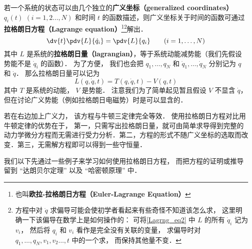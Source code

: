 

若一个系统的状态可以由几个独立的\textbf{广义坐标（generalized coordinates）} $q_i(t)$ $(i=1,2\dots,N)$ 和时间 $t$ 的函数描述，则广义坐标关于时间的函数可通过\textbf{拉格朗日方程（Lagrange equation）}\footnote{也叫\textbf{欧拉-拉格朗日方程（Euler-Lagrange Equation）}}\footnote{方程中对 $\dot q$ 求偏导可能会使初学者看起来有些奇怪不知道该怎么求， 这里明确一下该偏导在数学上是如何操作的： 可将\autoref{Lagrng_eq2} 中 $L$ 的所有 $\dot q_i$ 记为 $v_i$， 然后将 $q_i$ 和 $v_i$ 看作是完全没有关联的变量， 求偏导时对 $q_1,\dots, q_N, v_1, v_2\dots,t$ 中的一个求， 而保持其他量不变．}解出．
\begin{equation}\label{Lagrng_eq1}
\dv{t} \pdv{L}{\dot q_i} = \pdv{L}{q_i}
\qquad (i=1,\dots,N)
\end{equation}
其中 $L$ 是系统的\textbf{拉格朗日量（lagrangian）}，等于系统动能减势能（我们先假设势能不是 $\dot q_i$ 的函数）． 为了方便， 我们也会把 $q_1, \dots, q_N$ 和 $\dot q_1,\dots,\dot q_N$ 分别记为 $q$ 和 $\dot q$． 那么拉格朗日量可以记为
\begin{equation}\label{Lagrng_eq2}
L(q, \dot q, t) = T(q, \dot q, t) - V(q, t)
\end{equation}
其中 $T$ 是系统的动能， $V$ 是势能． 注意我们为了简单起见暂且假设 $V$ 不显含 $\dot q$， 但在讨论广义势能（例如拉格朗日电磁势）时是可以显含的．

若在右边加上广义力， 该方程与牛顿三定律完全等效． 使用拉格朗日方程对比用牛顿定律的优势在于， 第一，只需写出拉格朗日量，就可由简单求导得到完整的动力学微分方程而无需进行受力分析．第二，方程的形式不随广义坐标的选取而改变．第三，无需解方程即可以得到一些守恒量．

我们以下先通过一些例子来学习如何使用拉格朗日方程， 而把方程的证明或推导留到 “达朗贝尔定理” 以及 “哈密顿原理” 中．

